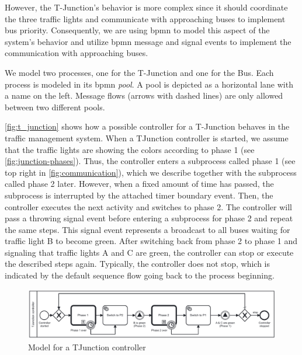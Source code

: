\documentclass{jot}
\begin{document}
However, the T-Junction's behavior is more complex since it should coordinate the three traffic lights and communicate with approaching buses to implement bus priority.
Consequently, we are using \gls*{bpmn} to model this aspect of the system's behavior and utilize \gls*{bpmn} message and signal events to implement the communication with approaching buses.

We model two processes, one for the T-Junction and one for the Bus.
Each process is modeled in its \gls*{bpmn} \emph{pool}.
A pool is depicted as a horizontal lane with a name on the left.
Message flows (arrows with dashed lines) are only allowed between two different pools.

\autoref{fig:t_junction} shows how a possible controller for a T-Junction behaves in the traffic management system.
When a TJunction controller is started, we assume that the traffic lights are showing the colors according to phase 1 (see \cref{fig:junction-phases}).
Thus, the controller enters a subprocess called phase 1 (see top right in \cref{fig:communication}), which we describe together with the subprocess called phase 2 later.
However, when a fixed amount of time has passed, the subprocess is interrupted by the attached timer boundary event.
Then, the controller executes the next activity and switches to phase 2.
The controller will pass a throwing signal event before entering a subprocess for phase 2 and repeat the same steps.
This signal event represents a broadcast to all buses waiting for traffic light B to become green.
After switching back from phase 2 to phase 1 and signaling that traffic lights A and C are green, the controller can stop or execute the described steps again.
Typically, the controller does not stop, which is indicated by the default sequence flow going back to the process beginning.

\begin{figure}[h]
    \centering
    \includegraphics[width=1\textwidth]{figures/t-junction.pdf}
    \caption{Model for a TJunction controller}
    \label{fig:t_junction}
\end{figure}
\end{document}
